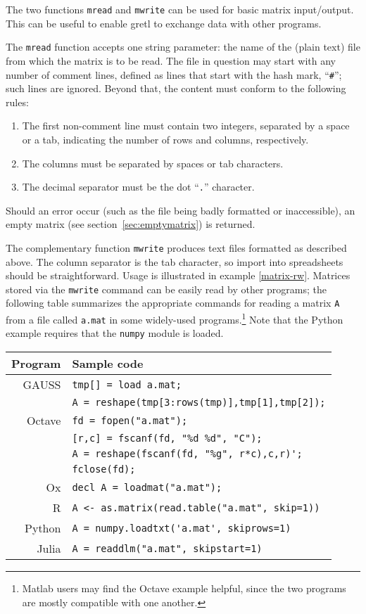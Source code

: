The two functions \texttt{mread} and \texttt{mwrite} can be used for
basic matrix input/output. This can be useful to enable gretl to
exchange data with other programs.

The \texttt{mread} function accepts one string parameter: the name of
the (plain text) file from which the matrix is to be read.  The file
in question may start with any number of comment lines, defined as
lines that start with the hash mark, ``\texttt{\#}''; such lines are
ignored.  Beyond that, the content must conform to the following
rules:
%
\begin{enumerate}
\item The first non-comment line must contain two integers, separated
  by a space or a tab, indicating the number of rows and columns,
  respectively.
\item The columns must be separated by spaces or tab characters.
\item The decimal separator must be the dot ``\texttt{.}'' character.
\end{enumerate}

Should an error occur (such as the file being badly formatted or
inaccessible), an empty matrix (see section~\ref{sec:emptymatrix}) is
returned.

The complementary function \texttt{mwrite} produces text files
formatted as described above.  The column separator is the tab
character, so import into spreadsheets should be straightforward.
Usage is illustrated in example \ref{matrix-rw}.  Matrices stored via
the \texttt{mwrite} command can be easily read by other programs; the
following table summarizes the appropriate commands for reading a
matrix \texttt{A} from a file called \texttt{a.mat} in some
widely-used programs.\footnote{Matlab users may find the Octave
  example helpful, since the two programs are mostly compatible with
  one another.} Note that the Python example requires that the
\texttt{numpy} module is loaded.

\begin{center}
  \begin{tabular}{rl}
    \textbf{Program} & \textbf{Sample code} \\
    \hline
    GAUSS  & \verb|tmp[] = load a.mat;| \\
    & \verb|A = reshape(tmp[3:rows(tmp)],tmp[1],tmp[2]);| \\
    Octave & \verb|fd = fopen("a.mat");| \\
    & \verb|[r,c] = fscanf(fd, "%d %d", "C");| \\
    & \verb|A = reshape(fscanf(fd, "%g", r*c),c,r)';| \\
    & \verb|fclose(fd);| \\
    Ox     & \verb|decl A = loadmat("a.mat");| \\
    R      & \verb|A <- as.matrix(read.table("a.mat", skip=1))| \\
    Python & \verb|A = numpy.loadtxt('a.mat', skiprows=1)| \\
    Julia  & \verb|A = readdlm("a.mat", skipstart=1)| \\
  \hline
\end{tabular}
\end{center}


